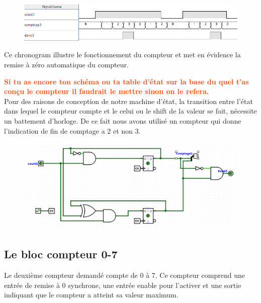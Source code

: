 \documentclass[a4paper]{article} %
\newcommand{\red}[1]{\textbf{\textcolor{OrangeRed}{#1}}}
\begin{document}
\begin{tcolorbox}[colframe=Monokaimagenta,colback=white, breakable, enhanced]
\begin{figure}[H]
	\centering
	\includegraphics[width=\textwidth]{src/chrono_CPT3_1}
	\label{fig:chrono_CPT_03_1}
\end{figure}
Ce chronogram illustre le fonctionnement du compteur et met en évidence la remise à zéro automatique du compteur.

\red{Si tu as encore ton schéma ou ta table d'état sur la base du quel t'as conçu le compteur il faudrait le mettre sinon on le refera.}\\

Pour des raisons de conception de notre machine d'état, la transition entre l'état dans lequel le compteur compte et le celui ou le shift de la valeur se fait, nécessite un battement d'horloge. De ce fait nous avons utilisé un compteur qui donne l'indication de fin de comptage a 2 et non 3.
\begin{figure}[H]
	\centering
	\includegraphics[width=\textwidth]{src/CPT_03_2}
	\label{fig:CPT_03_2}
\end{figure}
\end{tcolorbox}

\subsection{Le bloc compteur 0-7}
Le deuxième compteur demandé compte de 0 à 7. Ce compteur comprend une entrée de remise à 0 synchrone, une entrée enable pour l’activer et une sortie indiquant que le compteur a atteint sa valeur maximum.
\end{document}
